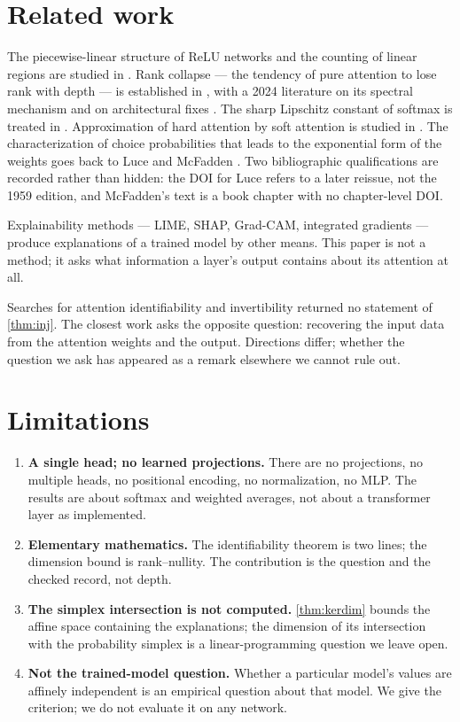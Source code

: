 \documentclass[11pt]{article}
\begin{document}
\section{Related work}\label{sec:related}

The piecewise-linear structure of ReLU networks and the counting of linear
regions are studied in \cite{montufar,telgarsky,arora}. Rank collapse --- the
tendency of pure attention to lose rank with depth --- is established in
\cite{dong}, with a 2024 literature on its spectral mechanism \cite{gap} and on
architectural fixes \cite{lambda}. The sharp Lipschitz constant of softmax is
treated in \cite{lip}. Approximation of hard attention by soft attention is
studied in \cite{hardattn}. The characterization of choice probabilities that leads to the exponential
form of the weights goes back to Luce \cite{luce} and McFadden \cite{mcfadden}.
Two bibliographic qualifications are recorded rather than hidden: the DOI for
Luce refers to a later reissue, not the 1959 edition, and McFadden's text is a
book chapter with no chapter-level DOI.

Explainability methods --- LIME, SHAP, Grad-CAM, integrated gradients
\cite{lime,shap,gradcam,ig} --- produce explanations of a trained model by other
means. This paper is not a method; it asks what information a layer's output
contains about its attention at all.

Searches for attention identifiability and invertibility returned no statement
of \cref{thm:inj}. The closest work \cite{unmask} asks the opposite question:
recovering the input data from the attention weights and the output. Directions
differ; whether the question we ask has appeared as a remark elsewhere we cannot
rule out.

\section{Limitations}\label{sec:limits}

\begin{enumerate}
\item \textbf{A single head; no learned projections.} There are no projections,
  no multiple heads, no positional encoding, no normalization, no MLP. The results are about softmax
  and weighted averages, not about a transformer layer as implemented.
\item \textbf{Elementary mathematics.} The identifiability theorem is two lines;
  the dimension bound is rank--nullity. The contribution is the question and the
  checked record, not depth.
\item \textbf{The simplex intersection is not computed.} \cref{thm:kerdim}
  bounds the affine space containing the explanations; the dimension of its
  intersection with the probability simplex is a linear-programming question we
  leave open.
\item \textbf{Not the trained-model question.} Whether a particular model's
  values are affinely independent is an empirical question about that model. We
  give the criterion; we do not evaluate it on any network.
\end{enumerate}
\end{document}
